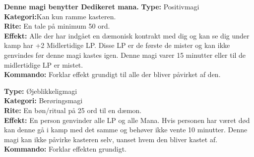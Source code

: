\begin{falden*}
\textbf{Denne magi benytter Dedikeret mana.}
\textbf{Type:} Positivmagi\\
\textbf{Kategori:}Kan kun ramme kasteren.\\
\textbf{Rite:} En tale på minimum 50 ord.\\
\textbf{Effekt:} Alle der har indgået en dæmonisk kontrakt med dig og kan se dig under kamp har +2 Midlertidige LP. Disse LP er de første de mister og kan ikke genvindes før denne magi kastes igen. Denne magi varer 15 minutter eller til de midlertidige LP er mistet.\\
\textbf{Kommando:} Forklar effekt grundigt til alle der bliver påvirket af den.
\end{falden*}

\begin{falden*}
\textbf{Type:} Øjeblikkeligmagi\\
\textbf{Kategori:} Berøringsmagi\\
\textbf{Rite:} En bøn/ritual på 25 ord til en dæmon.\\
\textbf{Effekt:} En person genvinder alle LP og alle Mana. Hvis personen har været død kan denne gå i kamp med det samme og behøver ikke vente 10 minutter. Denne magi kan ikke påvirke kasteren selv, uanset hvem den bliver kastet af.\\
\textbf{Kommando:} Forklar effekten grundigt.
\end{falden*}
